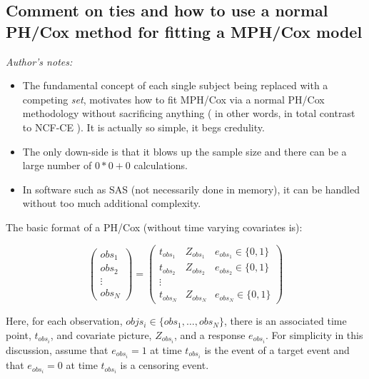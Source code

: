 \documentclass[10pt]{article}
\begin{document}
\subsection{Comment on ties and how to use a normal PH/Cox method for fitting a MPH/Cox model}

{\em Author's notes:}  
\begin{itemize}
    \item The fundamental concept of each single subject being replaced with a competing {\em set}, motivates how to fit MPH/Cox via a normal PH/Cox
methodology without sacrificing anything ( in other words, in total contrast to NCF-CE ).  It is actually so simple, it begs credulity.
    \item The only down-side is that it blows up the sample size and there can be a large number of $0*0+0$ calculations.  
    \item In software such as SAS (not necessarily done in memory), it can be handled without too
much additional complexity.
\end{itemize}


The basic format of a PH/Cox (without time varying covariates is):


\begin{equation*}
\begin{pmatrix}
obs_1 \\
obs_2 \\
\vdots \\
obs_N
\end{pmatrix}
=
\begin{pmatrix}
    t_{obs_1} & Z_{obs_1} & e_{obs_1} \in \{0, 1\} \\
    t_{obs_2} & Z_{obs_2} & e_{obs_2} \in \{0, 1\} \\
\vdots \\
    t_{obs_N} & Z_{obs_N} & e_{obs_N} \in \{0, 1\} 
\end{pmatrix}
\end{equation*}

Here, for each observation, $objs_i \in \{obs_1, \ldots, obs_N\}$, there is an associated time point, $t_{obs_i}$, and covariate picture,
$Z_{obs_i}$, and
a response $e_{obs_i}$.  For simplicity in this discussion, assume that $e_{obs_i}=1$ at time $t_{obs_i}$ is the event of a target event and that $e_{obs_i}=0$
at time $t_{obs_i}$ is a censoring event.
\end{document}
